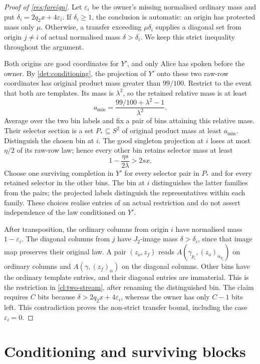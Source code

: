 \documentclass[11pt]{article} \usepackage[utf8]{inputenc}
\theoremstyle{plain} \newtheorem{theorem}{Theorem}[section]
\theoremstyle{definition} \newaliascnt{definition}{theorem}
\begin{document}
\begin{proof}[Proof of \cref{res:foreign}]
Let $\varepsilon_i$ be the owner's missing normalised ordinary mass and put
$\delta_i=2q_2x+4\varepsilon_i$. If $\delta_i\ge1$, the conclusion is automatic:
an origin has protected mass only $\mu$. Otherwise, a transfer exceeding
$\mu\delta_i$ supplies a diagonal set from origin $j\ne i$ of actual normalised
mass $\delta>\delta_i$. We keep this strict inequality throughout the argument.

Both origins are good coordinates for $Y'$, and only Alice has spoken before
the owner. By \cref{det:conditioning}, the projection of $Y'$ onto these two
raw-row coordinates has original product mass greater than $99/100$.
Restrict to the event that both are templates. Its mass is $\lambda^2$, so the
retained relative mass is at least
\[
a_{\min}=\frac{99/100+\lambda^2-1}{\lambda^2}.
\]
Average over the two bin labels and fix a pair of bins attaining this relative
mass. Their selector section is a set $P_*\subseteq S^2$ of original product
mass at least $a_{\min}$. Distinguish the chosen bin at $i$. The good singleton
projection at $i$ loses at most $\eta/2$ of its raw-row law; hence every other
bin retains selector mass at least
\[
1-\frac{\eta s}{2\lambda}>2sx.
\]
Choose one surviving completion in $Y'$ for every selector pair in $P_*$ and
for every retained selector in the other bins. The bin at $i$ distinguishes
the latter families from the pairs; the projected labels distinguish the
representatives within each family. These choices realise entries of an
actual restriction and do not assert independence of the law conditioned on
$Y'$.

After transposition, the ordinary columns from origin $i$ have normalised mass
$1-\varepsilon_i$. The diagonal columns from $j$ have $J_2$-image mass
$\delta>\delta_i$, since that image map preserves their original law. A pair
$(z_o,z_f)$ reads $A(\gamma_{p_i},(z_o)_{\alpha_{p_i}})$ on ordinary columns and
$A(\gamma,(z_f)_\alpha)$ on the diagonal columns. Other bins have the ordinary
template entries, and their diagonal entries are immaterial. This is the
restriction in \cref{cl:two-stream}, after renaming the distinguished bin.
The claim requires $C$ bits because $\delta>2q_2x+4\varepsilon_i$, whereas the
owner has only $C-1$ bits left. This contradiction proves the non-strict
transfer bound, including the case $\varepsilon_i=0$.
\end{proof}

\section{Conditioning and surviving blocks}
\label{sec:conditioning-details}
\end{document}
